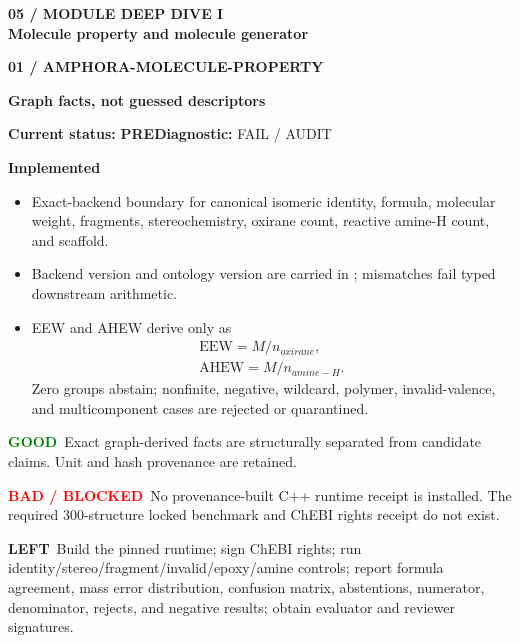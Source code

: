 \documentclass[10pt,a4paper]{article}
\newcommand{\PageTitle}[2]{%
  {\sffamily\fontsize{7.5}{9}\selectfont\bfseries\color{Cyan}\MakeUppercase{#1}}\\[-1pt]
  {\sffamily\fontsize{20}{22}\selectfont\bfseries\color{Navy}#2}\par\vspace{3mm}}
\newcommand{\eyebrow}[1]{{\sffamily\fontsize{7}{8}\selectfont\bfseries\color{Cyan}\MakeUppercase{#1}}}
\newcommand{\good}{\textcolor{Green}{\bfseries GOOD}}
\newcommand{\bad}{\textcolor{Red}{\bfseries BAD / BLOCKED}}
\newcommand{\lefttodo}{\textcolor{Amber}{\bfseries LEFT}}
\newcommand{\prephase}{\textcolor{Amber}{\bfseries PRE}}
\newcommand{\code}[1]{{\ttfamily\fontsize{7.2}{8.4}\selectfont\detokenize{#1}}}
\begin{document}
\PageTitle{05 / Module deep dive I}{Molecule property and molecule generator}
\begin{minipage}[t]{.488\linewidth}
\begin{tcolorbox}[height=160mm,colback=PaleBlue,colframe=Blue!35,boxrule=.6pt,arc=2mm,left=3mm,right=3mm,top=3mm,bottom=3mm]
\eyebrow{01 / amphora-molecule-property}\par
{\sffamily\Large\bfseries\color{Navy}Graph facts, not guessed descriptors}\par
\textbf{Current status:} \prephase\quad \textbf{Diagnostic:} FAIL / AUDIT

\textbf{Implemented}
\begin{itemize}
  \item Exact-backend boundary for canonical isomeric identity, formula, molecular weight, fragments, stereochemistry, oxirane count, reactive amine-H count, and scaffold.
  \item Backend version and ontology version are carried in \code{MoleculeFactsV1}; mismatches fail typed downstream arithmetic.
  \item EEW and AHEW derive only as
  \[\begin{gathered}\mathrm{EEW}=M/n_{oxirane},\\[-1mm]\mathrm{AHEW}=M/n_{amine-H}.\end{gathered}\]
  Zero groups abstain; nonfinite, negative, wildcard, polymer, invalid-valence, and multicomponent cases are rejected or quarantined.
\end{itemize}
\good\ Exact graph-derived facts are structurally separated from candidate claims. Unit and hash provenance are retained.

\bad\ No provenance-built C++ runtime receipt is installed. The required 300-structure locked benchmark and ChEBI rights receipt do not exist.

\lefttodo\ Build the pinned runtime; sign ChEBI rights; run identity/stereo/fragment/invalid/epoxy/amine controls; report formula agreement, mass error distribution, confusion matrix, abstentions, numerator, denominator, rejects, and negative results; obtain evaluator and reviewer signatures.
\end{tcolorbox}
\end{minipage}\hfill
\end{document}
